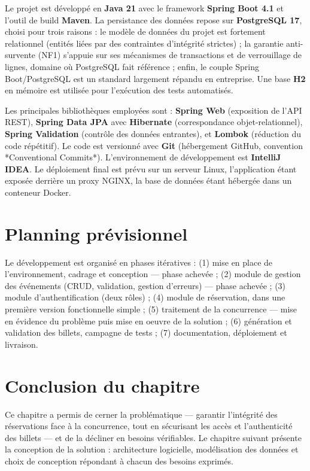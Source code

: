 \documentclass[12pt,a4paper]{report}
\begin{document}
Le projet est développé en \textbf{Java 21} avec le framework \textbf{Spring Boot 4.1} et l'outil de build \textbf{Maven}. La persistance des données repose sur \textbf{PostgreSQL 17}, choisi pour trois raisons : le modèle de données du projet est fortement relationnel (entités liées par des contraintes d'intégrité strictes) ; la garantie anti-survente (NF1) s'appuie sur ses mécanismes de transactions et de verrouillage de lignes, domaine où PostgreSQL fait référence ; enfin, le couple Spring Boot/PostgreSQL est un standard largement répandu en entreprise. Une base \textbf{H2} en mémoire est utilisée pour l'exécution des tests automatisés.

Les principales bibliothèques employées sont : \textbf{Spring Web} (exposition de l'API REST), \textbf{Spring Data JPA} avec \textbf{Hibernate} (correspondance objet-relationnel), \textbf{Spring Validation} (contrôle des données entrantes), et \textbf{Lombok} (réduction du code répétitif). Le code est versionné avec \textbf{Git} (hébergement GitHub, convention *Conventional Commits*). L'environnement de développement est \textbf{IntelliJ IDEA}. Le déploiement final est prévu sur un serveur Linux, l'application étant exposée derrière un proxy NGINX, la base de données étant hébergée dans un conteneur Docker.

\section{Planning prévisionnel}

Le développement est organisé en phases itératives : (1) mise en place de l'environnement, cadrage et conception — phase achevée ; (2) module de gestion des événements (CRUD, validation, gestion d'erreurs) — phase achevée ; (3) module d'authentification (deux rôles) ; (4) module de réservation, dans une première version fonctionnelle simple ; (5) traitement de la concurrence — mise en évidence du problème puis mise en oeuvre de la solution ; (6) génération et validation des billets, campagne de tests ; (7) documentation, déploiement et livraison.

\section{Conclusion du chapitre}

Ce chapitre a permis de cerner la problématique — garantir l'intégrité des réservations face à la concurrence, tout en sécurisant les accès et l'authenticité des billets — et de la décliner en besoins vérifiables. Le chapitre suivant présente la conception de la solution : architecture logicielle, modélisation des données et choix de conception répondant à chacun des besoins exprimés.
\end{document}
